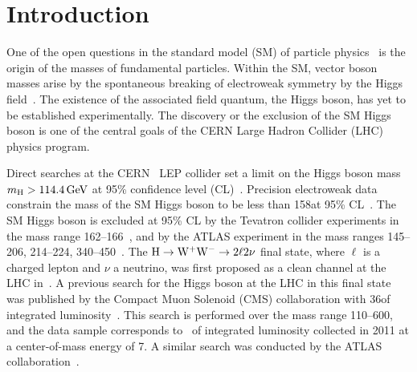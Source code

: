 \documentclass[11pt,twoside,a4paper,cmspaper,final,collab]{cms-tdr}
\begin{document}
\section{Introduction}
One of the open questions in the standard model (SM) of particle
physics~\cite{SM1,SM2,SM3} is the origin of the masses of fundamental
particles. Within the SM, vector boson masses arise by the
spontaneous breaking of electroweak symmetry by the
Higgs field~\cite{Higgs1, Higgs2, Higgs3,Higgs4, Higgs5, Higgs6}.
The existence of the associated field quantum, the Higgs boson, has yet to be
established experimentally. The discovery or the exclusion of the SM
Higgs boson is one of the central goals of the CERN Large Hadron Collider (LHC)
physics program.

Direct searches at the CERN \Pep{}\Pem\ LEP collider set a limit on
the Higgs boson mass $m_{\mathrm{H}} > 114.4\,\text{Ge\hspace{-.08em}V}$ at 95\% confidence level
(CL)~\cite{LEPHIGGS}. Precision electroweak data
constrain the mass of the SM Higgs boson to
be less than 158\GeV at 95\% CL~\cite{EWK}.
The SM Higgs boson is excluded at 95\% CL by the
Tevatron collider experiments in the mass range 162--166\GeV~\cite{TEVHIGGS_2010},
and by the ATLAS experiment in the mass ranges 145--206, 214--224,
340--450\GeV~\cite{AtlasHWW,AtlasHZZ4l,AtlasHZZ2l2n}.
The $\mathrm{H} \to \mathrm{W^+}{}\mathrm{W^-} \to 2\ell 2\nu$ final state, where $\ell$ is a charged lepton
and $\nu$ a neutrino, was first proposed as a clean channel at the LHC in~\cite{dittmar}.
A previous search for the Higgs boson at the LHC in this final state
was published  by the Compact Muon Solenoid (CMS) collaboration
with 36\pbinv of integrated luminosity~\cite{HWW2010}.
This search is performed over the mass range 110--600\GeV, and the data
sample corresponds to \usedLumiWithSyst\ of integrated luminosity
collected in 2011 at a center-of-mass energy of 7\TeV.
A similar search was conducted by the ATLAS collaboration~\cite{AtlasHWW}.
\end{document}
